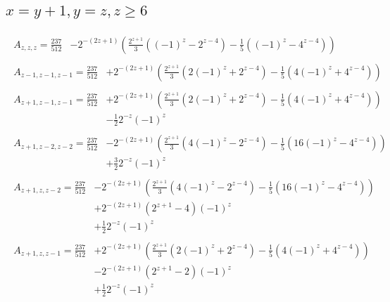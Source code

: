 \newpage
\subsection*{$x=y+1,y=z,z\ge6$}
\begin{align*}
\begin{split}
A_{z,z,z}=\frac{237}{512} &-2^{-(2z+1)}\left(\frac{2^{z+1}}{3}\left((-1)^z-2^{z-4}\right)-\frac{1}{5}\left((-1)^z-4^{z-4}\right)\right)
\end{split}\\
\begin{split}
A_{z-1,z-1,z-1}=\frac{237}{512} &+2^{-(2z+1)}\left(\frac{2^{z+1}}{3}\left(2(-1)^z+2^{z-4}\right)-\frac{1}{5}\left(4(-1)^z+4^{z-4}\right)\right)
\end{split}\\
\begin{split}
A_{z+1,z-1,z-1}=\frac{237}{512} &+2^{-(2z+1)}\left(\frac{2^{z+1}}{3}\left(2(-1)^z+2^{z-4}\right)-\frac{1}{5}\left(4(-1)^z+4^{z-4}\right)\right)\\
& -\frac{1}{2}2^{-z}(-1)^z
\end{split}\\
\begin{split}
A_{z+1,z-2,z-2}=\frac{237}{512} &-2^{-(2z+1)}\left(\frac{2^{z+1}}{3}\left(4(-1)^z-2^{z-4}\right)-\frac{1}{5}\left(16(-1)^z-4^{z-4}\right)\right)\\
& +\frac{3}{2}2^{-z}(-1)^z
\end{split}\\
\begin{split}
A_{z+1,z,z-2}=\frac{237}{512} &-2^{-(2z+1)}\left(\frac{2^{z+1}}{3}\left(4(-1)^z-2^{z-4}\right)-\frac{1}{5}\left(16(-1)^z-4^{z-4}\right)\right)\\
& +2^{-(2z+1)}\left(2^{z+1}-4\right)(-1)^z\\
& +\frac{1}{2}2^{-z}(-1)^z
\end{split}\\
\begin{split}
A_{z+1,z,z-1}=\frac{237}{512} &+2^{-(2z+1)}\left(\frac{2^{z+1}}{3}\left(2(-1)^z+2^{z-4}\right)-\frac{1}{5}\left(4(-1)^z+4^{z-4}\right)\right)\\
& -2^{-(2z+1)}\left(2^{z+1}-2\right)(-1)^z\\
& +\frac{1}{2}2^{-z}(-1)^z
\end{split}
\end{align*}

\newpage
